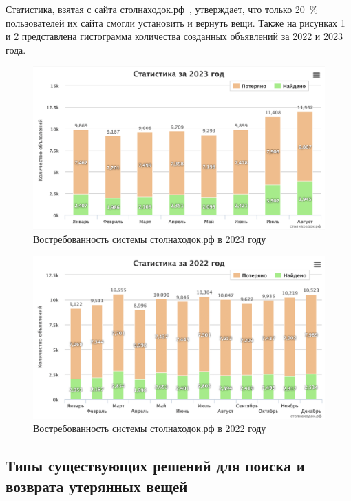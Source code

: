 \documentclass{mirea}
\begin{document}
Статистика, взятая с сайта \href{http://xn--80aisbkedbuk1b.xn--p1ai/}{столнаходок.рф}~\cite{bib:stol_nahodok}, утверждает, что только 20~\% пользователей их сайта смогли установить и вернуть вещи. Также на рисунках \ref{fig:chart2023} и \ref{fig:chart2022} представлена гистограмма количества созданных объявлений за 2022 и 2023 года.

\begin{figure}[htb]
	\centering
	\includegraphics[width=.95\textwidth]{images/chart2023}
	\parskip=6pt
	\caption{Востребованность системы столнаходок.рф в 2023 году}
	\label{fig:chart2023}
\end{figure}

\begin{figure}[htb]
	\centering
	\includegraphics[width=.95\textwidth]{images/chart2022}
	\parskip=6pt
	\caption{Востребованность системы столнаходок.рф в 2022 году}
	\label{fig:chart2022}
\end{figure}

\subsection{Типы существующих решений для поиска и возврата утерянных вещей}
\end{document}
